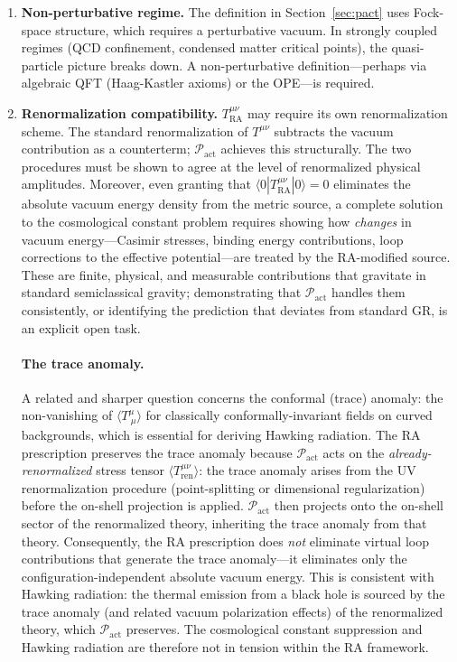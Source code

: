 \documentclass[11pt,a4paper]{article}
\theoremstyle{plain}
\theoremstyle{definition}
\theoremstyle{remark}
\newcommand{\Pact}{\mathcal{P}_{\mathrm{act}}}
\newcommand{\Tact}{T^{\mu\nu}_{\mathrm{RA}}}
\begin{document}
\begin{enumerate}[label=(\roman*)]
  \item \textbf{Non-perturbative regime.} The definition in
  Section~\ref{sec:pact} uses Fock-space structure, which requires a perturbative
  vacuum. In strongly coupled regimes (QCD confinement, condensed matter critical
  points), the quasi-particle picture breaks down. A non-perturbative
  definition---perhaps via algebraic QFT (Haag-Kastler axioms) or the OPE---is
  required.

  \item \textbf{Renormalization compatibility.} $\Tact$ may require its own
  renormalization scheme. The standard renormalization of $T^{\mu\nu}$ subtracts
  the vacuum contribution as a counterterm; $\Pact$ achieves this structurally.
  The two procedures must be shown to agree at the level of renormalized physical
  amplitudes. Moreover, even granting that $\langle 0|\Tact|0\rangle = 0$
  eliminates the absolute vacuum energy density from the metric source, a complete
  solution to the cosmological constant problem requires showing how
  \emph{changes} in vacuum energy---Casimir stresses, binding energy
  contributions, loop corrections to the effective potential---are treated by the
  RA-modified source. These are finite, physical, and measurable contributions
  that gravitate in standard semiclassical gravity; demonstrating that $\Pact$
  handles them consistently, or identifying the prediction that deviates from
  standard GR, is an explicit open task.

  \paragraph{The trace anomaly.}
  A related and sharper question concerns the conformal (trace) anomaly: the
  non-vanishing of $\langle T^{\mu}_{\ \mu}\rangle$ for classically
  conformally-invariant fields on curved backgrounds, which is essential for
  deriving Hawking radiation. The RA prescription preserves the trace anomaly
  because $\Pact$ acts on the \emph{already-renormalized} stress tensor
  $\langle T^{\mu\nu}_{\mathrm{ren}}\rangle$: the trace anomaly arises from the
  UV renormalization procedure (point-splitting or dimensional regularization)
  before the on-shell projection is applied. $\Pact$ then projects onto the
  on-shell sector of the renormalized theory, inheriting the trace anomaly from
  that theory. Consequently, the RA prescription does \emph{not} eliminate virtual
  loop contributions that generate the trace anomaly---it eliminates only the
  configuration-independent absolute vacuum energy. This is consistent with
  Hawking radiation: the thermal emission from a black hole is sourced by the
  trace anomaly (and related vacuum polarization effects) of the renormalized
  theory, which $\Pact$ preserves. The cosmological constant suppression and
  Hawking radiation are therefore not in tension within the RA framework.


\end{enumerate}
\end{document}
